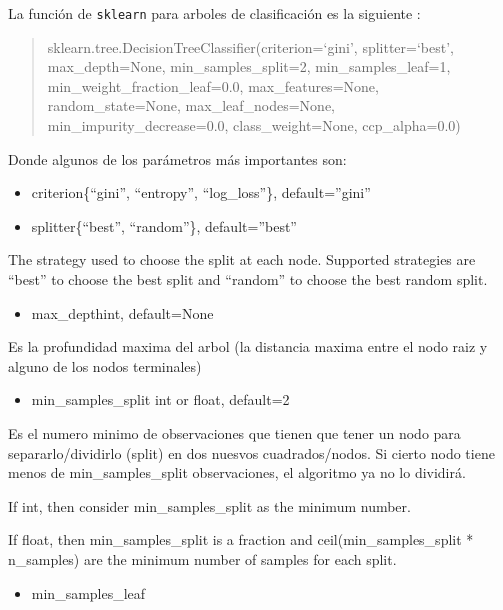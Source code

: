 \documentclass[
  11pt,
  a4paper,
]{article}
\providecommand{\tightlist}{%
  \setlength{\itemsep}{0pt}\setlength{\parskip}{0pt}}
\begin{document}
La función de \texttt{sklearn} para arboles de clasificación es la
siguiente :

\begin{quote}
sklearn.tree.DecisionTreeClassifier(criterion=`gini', splitter=`best',
max\_depth=None, min\_samples\_split=2, min\_samples\_leaf=1,
min\_weight\_fraction\_leaf=0.0, max\_features=None, random\_state=None,
max\_leaf\_nodes=None, min\_impurity\_decrease=0.0, class\_weight=None,
ccp\_alpha=0.0)
\end{quote}

Donde algunos de los parámetros más importantes son:

\begin{itemize}
\item
  criterion\{``gini'', ``entropy'', ``log\_loss''\}, default=''gini''
\item
  splitter\{``best'', ``random''\}, default=''best''
\end{itemize}

The strategy used to choose the split at each node. Supported strategies
are ``best'' to choose the best split and ``random'' to choose the best
random split.

\begin{itemize}
\tightlist
\item
  max\_depthint, default=None
\end{itemize}

Es la profundidad maxima del arbol (la distancia maxima entre el nodo
raiz y alguno de los nodos terminales)

\begin{itemize}
\tightlist
\item
  min\_samples\_split int or float, default=2
\end{itemize}

Es el numero minimo de observaciones que tienen que tener un nodo para
separarlo/dividirlo (split) en dos nuesvos cuadrados/nodos. Si cierto
nodo tiene menos de min\_samples\_split observaciones, el algoritmo ya
no lo dividirá.

If int, then consider min\_samples\_split as the minimum number.

If float, then min\_samples\_split is a fraction and
ceil(min\_samples\_split * n\_samples) are the minimum number of samples
for each split.

\begin{itemize}
\tightlist
\item
  min\_samples\_leaf
\end{itemize}
\end{document}
